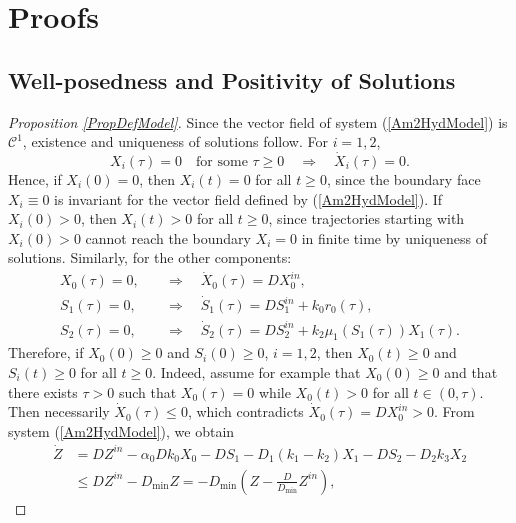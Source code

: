 \documentclass[runningheads]{llncs}
\begin{document}
\section{Proofs}                    \label{SecAppAProof}
\subsection{Well-posedness and Positivity of Solutions} \label{SecAppWPPS}
\begin{proof}[Proposition \ref{PropDefModel}]
Since the vector field of system (\ref{Am2HydModel}) is $\mathcal{C}^1$, existence and uniqueness of solutions follow. For $i=1,2$,
\[
X_i(\tau)=0 \quad \text{for some } \tau\ge0 \quad \Rightarrow \quad \dot X_i(\tau)=0 .
\]
Hence, if $X_i(0)=0$, then $X_i(t)=0$ for all $t\ge0$, since the boundary face $X_i\equiv0$ is invariant for the vector field defined by (\ref{Am2HydModel}).  
If $X_i(0)>0$, then $X_i(t)>0$ for all $t\ge0$, since trajectories starting with $X_i(0)>0$ cannot reach the boundary $X_i=0$ in finite time by uniqueness of solutions.
Similarly, for the other components:
\begin{align*}
X_0(\tau)=0, & \quad \Rightarrow \quad \dot X_0(\tau)=D X_0^{in},\\
S_1(\tau)=0, & \quad \Rightarrow \quad \dot S_1(\tau)=D S_1^{in}+k_0 r_0(\tau),\\
S_2(\tau)=0, & \quad \Rightarrow \quad \dot S_2(\tau)=D S_2^{in}+k_2\mu_1(S_1(\tau))X_1(\tau).
\end{align*}
Therefore, if $X_0(0)\ge0$ and $S_i(0)\ge0$, $i=1,2$, then $X_0(t)\ge0$ and $S_i(t)\ge0$ for all $t\ge0$.  
Indeed, assume for example that $X_0(0)\ge0$ and that there exists $\tau>0$ such that $X_0(\tau)=0$ while $X_0(t)>0$ for all $t\in(0,\tau)$. 
Then necessarily $\dot X_0(\tau)\le0$, which contradicts $\dot X_0(\tau)=D X_0^{in}>0$.
From system (\ref{Am2HydModel}), we obtain
\begin{align*}
\dot Z
&= D Z^{in} - \alpha_0 D k_0 X_0 - D S_1 - D_1 (k_1-k_2)X_1 - D S_2 - D_2 k_3 X_2 \\
&\le D Z^{in} - D_{\min} Z = -D_{\min}\!\left(Z-\tfrac{D}{D_{\min}}Z^{in}\right),

\end{align*}
\end{proof}
\end{document}
